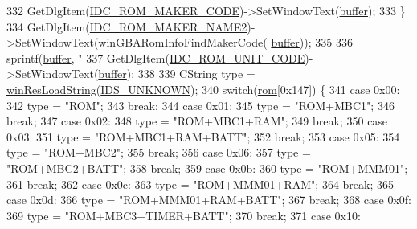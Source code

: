 \begin{DoxyCode}
{{332     GetDlgItem(\mbox{\hyperlink{resource_8h_adb5db445e06db6bc262e4d08818ad07b}{IDC\_ROM\_MAKER\_CODE}})->SetWindowText(\mbox{\hyperlink{_g_b_a_8cpp_a28d4d3d8445e73a696b2d6f7eadabd96}{buffer}});    
333   \}
334   GetDlgItem(\mbox{\hyperlink{resource_8h_a50f75ef54a459f12b6304c0dee222e2a}{IDC\_ROM\_MAKER\_NAME2}})->SetWindowText(winGBARomInfoFindMakerCode(
      \mbox{\hyperlink{_g_b_a_8cpp_a28d4d3d8445e73a696b2d6f7eadabd96}{buffer}}));
335   
336   sprintf(\mbox{\hyperlink{_g_b_a_8cpp_a28d4d3d8445e73a696b2d6f7eadabd96}{buffer}}, \textcolor{stringliteral}{"%
337   GetDlgItem(\mbox{\hyperlink{resource_8h_ac80d2dd85da7acdcbab3b0f5fadda0ac}{IDC\_ROM\_UNIT\_CODE}})->SetWindowText(\mbox{\hyperlink{_g_b_a_8cpp_a28d4d3d8445e73a696b2d6f7eadabd96}{buffer}});
338 
339   CString type = \mbox{\hyperlink{_win_res_util_8cpp_a416e85e80ab9b01376e87251c83d1a5a}{winResLoadString}}(\mbox{\hyperlink{resource_8h_a00abe5a7a718d1af70df572f576bba9c}{IDS\_UNKNOWN}});
340   \textcolor{keywordflow}{switch}(\mbox{\hyperlink{class_rom_info_g_b_ab7ac87e9a9566fce1f057d7c37f60770}{rom}}[0x147]) \{
341   \textcolor{keywordflow}{case} 0x00:
342     type = \textcolor{stringliteral}{"ROM"};
343     \textcolor{keywordflow}{break};
344   \textcolor{keywordflow}{case} 0x01:
345     type = \textcolor{stringliteral}{"ROM+MBC1"};
346     \textcolor{keywordflow}{break};
347   \textcolor{keywordflow}{case} 0x02:
348     type = \textcolor{stringliteral}{"ROM+MBC1+RAM"};
349     \textcolor{keywordflow}{break};
350   \textcolor{keywordflow}{case} 0x03:
351     type = \textcolor{stringliteral}{"ROM+MBC1+RAM+BATT"};
352     \textcolor{keywordflow}{break};
353   \textcolor{keywordflow}{case} 0x05:
354     type = \textcolor{stringliteral}{"ROM+MBC2"};
355     \textcolor{keywordflow}{break};
356   \textcolor{keywordflow}{case} 0x06:
357     type = \textcolor{stringliteral}{"ROM+MBC2+BATT"};
358     \textcolor{keywordflow}{break};
359   \textcolor{keywordflow}{case} 0x0b:
360     type = \textcolor{stringliteral}{"ROM+MMM01"};
361     \textcolor{keywordflow}{break};
362   \textcolor{keywordflow}{case} 0x0c:
363     type = \textcolor{stringliteral}{"ROM+MMM01+RAM"};
364     \textcolor{keywordflow}{break};
365   \textcolor{keywordflow}{case} 0x0d:
366     type = \textcolor{stringliteral}{"ROM+MMM01+RAM+BATT"};
367     \textcolor{keywordflow}{break};
368   \textcolor{keywordflow}{case} 0x0f:
369     type = \textcolor{stringliteral}{"ROM+MBC3+TIMER+BATT"};
370     \textcolor{keywordflow}{break};
371   \textcolor{keywordflow}{case} 0x10:
}}}
\end{DoxyCode}
